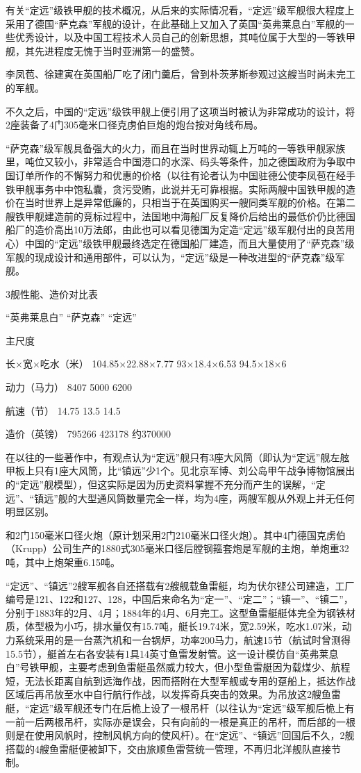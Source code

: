 \documentclass[12pt,UTF8]{ctexbook}
\begin{document}
有关“定远”级铁甲舰的技术概况，从后来的实际情况看，“定远”级军舰很大程度上采用了德国“萨克森”军舰的设计，在此基础上又加入了英国“英弗莱息白”军舰的一些优秀设计，以及中国工程技术人员自己的创新思想，其吨位属于大型的一等铁甲舰，其先进程度无愧于当时亚洲第一的盛赞。

李凤苞、徐建寅在英国船厂吃了闭门羹后，曾到朴茨茅斯参观过这艘当时尚未完工的军舰。

不久之后，中国的“定远”级铁甲舰上便引用了这项当时被认为非常成功的设计，将2座装备了4门305毫米口径克虏伯巨炮的炮台按对角线布局。

“萨克森”级军舰具备强大的火力，而且在当时世界动辄上万吨的一等铁甲舰家族里，吨位又较小，非常适合中国港口的水深、码头等条件，加之德国政府为争取中国订单所作的不懈努力和优惠的价格（以往有论者认为中国驻德公使李凤苞在经手铁甲舰事务中中饱私囊，贪污受贿，此说并无可靠根据。实际两艘中国铁甲舰的造价在当时世界上是异常低廉的，只相当于在英国购买一艘同类军舰的价格。在第二艘铁甲舰建造前的竞标过程中，法国地中海船厂反复降价后给出的最低价仍比德国船厂的造价高出10万法郎，由此也可以看见德国为定造“定远”级军舰付出的良苦用心）中国的“定远”级铁甲舰最终选定在德国船厂建造，而且大量使用了“萨克森”级军舰的现成设计和通用部件，可以认为，“定远”级是一种改进型的“萨克森”级军舰。

3舰性能、造价对比表

“英弗莱息白” “萨克森” “定远”

主尺度

长×宽×吃水（米） 104.85×22.88×7.77 93×18.4×6.53 94.5×18×6

动力（马力） 8407 5000 6200

航速（节） 14.75 13.5 14.5

造价（英镑） 795266 423178 约370000

在以往的一些著作中，有观点认为“定远”舰只有3座大风筒（即认为“定远”舰左舷甲板上只有1座大风筒，比“镇远”少1个。见北京军博、刘公岛甲午战争博物馆展出的“定远”舰模型），但这实际是因为历史资料掌握不充分而产生的误解，“定远”、“镇远”舰的大型通风筒数量完全一样，均为4座，两艘军舰从外观上并无任何明显区别。

和2门150毫米口径火炮（原计划采用2门210毫米口径火炮）。其中4门德国克虏伯（Krupp）公司生产的1880式305毫米口径后膛钢箍套炮是军舰的主炮，单炮重32吨，其中上炮架重6.15吨。

“定远”、“镇远”2艘军舰各自还搭载有2艘舰载鱼雷艇，均为伏尔铿公司建造，工厂编号是121、122和127、128，中国后来命名为“定一”、“定二”；“镇一”、“镇二”，分别于1883年的2月、4月；1884年的4月、6月完工。这型鱼雷艇艇体完全为钢铁材质，体型极为小巧，排水量仅有15.7吨，艇长19.74米，宽2.59米，吃水1.07米，动力系统采用的是一台蒸汽机和一台锅炉，功率200马力，航速15节（航试时曾测得15.5节），艇首左右各安装有1具14英寸鱼雷发射管。这一设计模仿自“英弗莱息白”号铁甲舰，主要考虑到鱼雷艇虽然威力较大，但小型鱼雷艇因为载煤少、航程短，无法长距离自航到远海作战，因而搭附在大型军舰或专用的趸船上，抵达作战区域后再吊放至水中自行航行作战，以发挥奇兵突击的效果。为吊放这2艘鱼雷艇，“定远”级军舰还专门在后桅上设了一根吊杆（以往认为“定远”级军舰后桅上有一前一后两根吊杆，实际亦是误会，只有向前的一根是真正的吊杆，而后部的一根则是在使用风帆时，控制风帆方向的使风杆）。在“定远”、“镇远”回国后不久，2舰搭载的4艘鱼雷艇便被卸下，交由旅顺鱼雷营统一管理，不再归北洋舰队直接节制。
\end{document}
